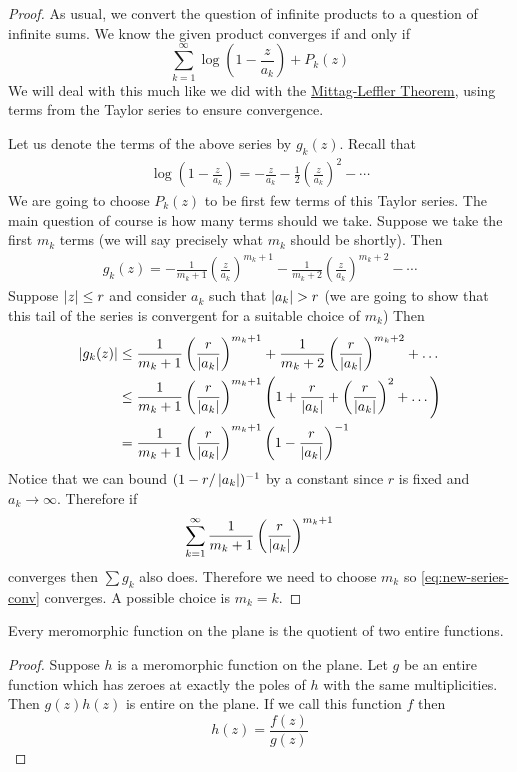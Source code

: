 \begin{proof}
    As usual, we convert the question of infinite products to a question of infinite sums. We know the given product converges if and only if 
    $$\sum_{k = 1}^\infty \log \left(1 - \frac{z}{a_k} \right) + P_k(z)$$
    We will deal with this much like we did with the \hyperref[thm:mittag-leffler]{Mittag-Leffler Theorem}, using terms from the Taylor series to ensure convergence.
    
    Let us denote the terms of the above series by $g_k(z)$.
    Recall that 
    \begin{align*}
        \log \left( 1 - \frac{z}{a_k} \right) = -\frac{z}{a_k} - \frac{1}{2} \left( \frac{z}{a_k} \right)^2 - \cdots 
    \end{align*}
    We are going to choose $P_k(z)$ to be first few terms of this Taylor series. The main question of course is how many terms should we take. Suppose we take the first $m_k$ terms (we will say precisely what $m_k$ should be shortly). Then
    \begin{align*}
        g_k(z) = -\frac{1}{m_k + 1} \left( \frac{z}{a_k} \right)^{m_k + 1} - \frac{1}{m_k + 2}  \left( \frac{z}{a_k} \right)^{m_k + 2} - \cdots 
    \end{align*}
    Suppose $\left|z\right| \leq r$ and consider $a_k$ such that $\left|a_k\right| > r$ (we are going to show that this tail of the series is convergent for a suitable choice of $m_k$) Then 
    \begin{align*}
        \left|g_k(z)\right| &\leq \frac{1}{m_k + 1} \left( \frac{r}{\left|a_k\right|} \right)^{m_k + 1} + \frac{1}{m_k + 2} \left( \frac{r}{\left|a_k\right|} \right)^{m_k + 2} + \dots \\
        &\leq \frac{1}{m_k + 1} \left( \frac{r}{\left|a_k\right|} \right)^{m_k + 1} \left(1 + \frac{r}{\left|a_k\right|} + \left(\frac{r}{\left|a_k\right|}\right)^2 + \dots \right)\\
        &= \frac{1}{m_{k} + 1} \left(\frac{r}{\left|a_k\right|}\right)^{m_k + 1} \left( 1 - \frac{r}{\left|a_k\right|} \right)^{-1}
    \end{align*}
    Notice that we can bound $(1 - r/\left|a_k\right|)^{-1}$ by a constant since $r$ is fixed and $a_k \to \infty$. Therefore if 
    \begin{equation}\label{eq:new-series-conv}
        \sum_{k = 1}^\infty \frac{1}{m_k + 1} \left( \frac{r}{\left|a_k\right|} \right)^{m_k + 1}
    \end{equation}
    converges then $\sum g_k$ also does. Therefore we need to choose $m_k$ so \eqref{eq:new-series-conv} converges. A possible choice is $m_k = k$. 
\end{proof}

\begin{corollary}
    Every meromorphic function on the plane is the quotient of two entire functions.
\end{corollary}
\begin{proof}
    Suppose $h$ is a meromorphic function on the plane. Let $g$ be an entire function which has zeroes at exactly the poles of $h$ with the same multiplicities. Then $g(z) h(z)$ is entire on the plane. If we call this function $f$ then
    $$h(z) = \frac{f(z)}{g(z)}$$
\end{proof}